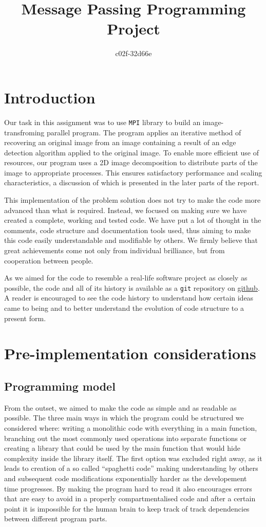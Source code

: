\documentclass[11pt,a4paper]{article}
\begin{document}
\title{Message Passing Programming Project}
\author{c02f-32d66e}
\maketitle

\section{Introduction}
Our task in this assignment was to use \texttt{MPI} library to build an image-transfroming parallel program.
The program applies an iterative method of recovering an original image from an image containing a result of an edge detection algorithm applied to the original image. 
To enable more efficient use of resources, our program uses a 2D image decomposition to distribute parts of the image to appropriate processes. 
This ensures satisfactory performance and scaling characteristics, a discussion of which is presented in the later parts of the report.

This implementation of the problem solution does not try to make the code more advanced than what is required. 
Instead, we focused on making sure we have created a complete, working and tested code. 
We have put a lot of thought in the comments, code structure and documentation tools used, thus aiming to make this code easily understandable and modifiable by others. We firmly believe that great achievements come not only from individual brilliance, but from cooperation between people.

As we aimed for the code to resemble a real-life software project as closely as possible, the code and all of its history is available as a \texttt{git} repository on \href{https://github.com/mkawalec/5thyear/tree/master/mpp/MPP-casestudy}{github}. A reader is encouraged to see the code history to understand how certain ideas came to being and to better understand the evolution of code structure to a present form.

\section{Pre-implementation considerations}
\subsection{Programming model}
From the outset, we aimed to make the code as simple and as readable as possible.
The three main ways in which the program could be structured we considered where: writing a monolithic code with everything in a main function, branching out the most commonly used operations into separate functions or creating a library that could be used by the main function that would hide complexity inside the library itself.
The first option was excluded right away, as it leads to creation of a so called ``spaghetti code'' making understanding by others and subsequent code modifications exponentially harder as the developement time progresses. By making the program hard to read it also encourages errors that are easy to avoid in a properly compartmentalised code and after a certain point it is impossible for the human brain to keep track of track dependencies between different program parts.
\end{document}
